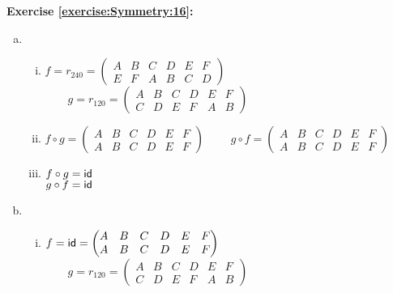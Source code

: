 \noindent\textbf{Exercise \ref{exercise:Symmetry:16}:}
\begin{enumerate}[(a)]
\item
	\begin{enumerate}[(i)]
	\item
	$f=r_{240}=\begin{pmatrix}
	A & B & C & D & E & F\\
	E & F & A & B & C & D
	\end{pmatrix}$
	$\qquad g=r_{120}=\begin{pmatrix}
	A & B & C & D & E & F\\
	C & D & E & F & A & B
	\end{pmatrix}$\\
	
	\item
	$f\circ g=\begin{pmatrix}
	A & B & C & D & E & F\\
	A & B & C & D & E & F
	\end{pmatrix}$
	$\qquad g\circ f=\begin{pmatrix}
	A & B & C & D & E & F\\
	A & B & C & D & E & F
	\end{pmatrix}$
	
	\item
	$f\circ g = \sf{id}$\\
	$g\circ f= \sf{id}$
	\end{enumerate}
	
\item
	\begin{enumerate}[(i)]
	\item
	$f=\sf{id}=\begin{pmatrix}
	A & B & C & D & E & F\\
	A & B & C & D & E & F
	\end{pmatrix}$
	$\qquad g=r_{120}=\begin{pmatrix}
	A & B & C & D & E & F\\
	C & D & E & F & A & B
	\end{pmatrix}$\\
	

\end{enumerate}
\end{enumerate}

